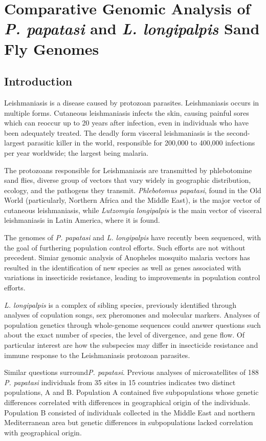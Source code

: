 \chapter{Comparative Genomic Analysis of \emph{P. papatasi} and \emph{L. longipalpis} Sand Fly Genomes}

\section{Introduction}
Leishmaniasis is a disease caused by protozoan parasites. Leishmaniasis occurs in multiple forms. Cutaneous leishmaniasis infects the skin, causing painful sores which can reoccur up to 20 years after infection, even in individuals who have been adequately treated. The deadly form visceral leishmaniasis is the second-largest parasitic killer in the world, responsible for 200,000 to 400,000 infections per year worldwide; the largest being malaria.

The protozoans responsible for Leishmaniasis are transmitted by phlebotomine sand flies, diverse group of vectors that vary widely in geographic distribution, ecology, and the pathogens they transmit. \emph{Phlebotomus papatasi}, found in the Old World (particularly, Northern Africa and the Middle East), is the major vector of cutaneous leishmaniasis, while \emph{Lutzomyia longipalpis} is the main vector of visceral leishmaniasis in Latin America, where it is found.

The genomes of \emph{P. papatasi} and \emph{L. longipalpis} have recently been sequenced, with the goal of furthering population control efforts. Such efforts are not without precedent. Simiar genomic analysis of Anopheles mosquito malaria vectors has resulted in the identification of new species as well as genes associated with variations in insecticide resistance, leading to improvements in  population control efforts.

\emph{L. longipalpis} is a complex of sibling species, previously identified through analyses of copulation songs, sex pheromones and molecular markers.  Analyses of population genetics through whole-genome sequences could answer questions such about the exact number of species, the level of divergence, and gene flow.  Of particular interest are how the subspecies may differ in insecticide resistance and immune response to the Leishmaniasis protozoan parasites.

Similar questions surround\emph{P. papatasi}.  Previous analyses of microsatellites of 188 \emph{P. papatasi} individuals from 35 sites in 15 countries indicates two distinct populations, A and B.  Population A contained five subpopulations whose genetic differences correlated with differences in geographical origin of the individuals.  Population B consisted of individuals collected in the Middle East and northern Mediterranean area but genetic differences in subpopulations lacked correlation with geographical origin.

